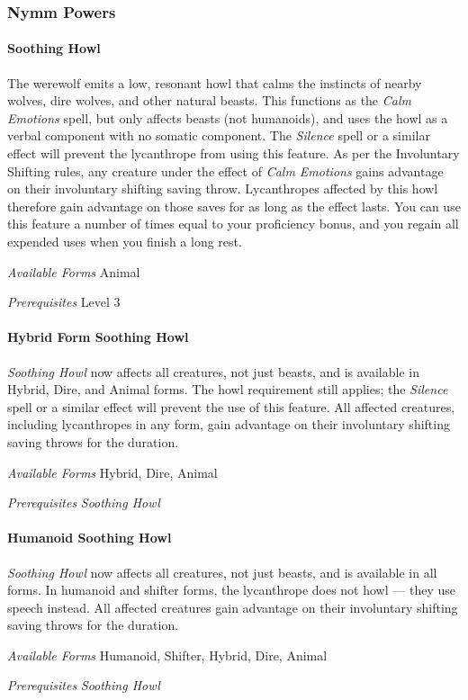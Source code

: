 \documentclass[twocolumn]{dndbook}
\begin{document}
\subsubsection{Nymm Powers}

\paragraph*{Soothing Howl}
The werewolf emits a low, resonant howl that calms the instincts of nearby wolves, dire wolves, and other natural beasts.
This functions as the \emph{Calm Emotions} spell, but only affects beasts (not humanoids), and uses the howl as a verbal component with no somatic component.
The \emph{Silence} spell or a similar effect will prevent the lycanthrope from using this feature.
As per the Involuntary Shifting rules, any creature under the effect of \emph{Calm Emotions} gains advantage on their involuntary shifting saving throw.
Lycanthropes affected by this howl therefore gain advantage on those saves for as long as the effect lasts.
You can use this feature a number of times equal to your proficiency bonus, and you regain all expended uses when you finish a long rest.\par
\emph{Available Forms} Animal\par
\emph{Prerequisites} Level 3\par

\paragraph*{Hybrid Form Soothing Howl}
\emph{Soothing Howl} now affects all creatures, not just beasts, and is available in Hybrid, Dire, and Animal forms.
The howl requirement still applies; the \emph{Silence} spell or a similar effect will prevent the use of this feature.
All affected creatures, including lycanthropes in any form, gain advantage on their involuntary shifting saving throws for the duration.\par
\emph{Available Forms} Hybrid, Dire, Animal\par
\emph{Prerequisites} \emph{Soothing Howl}\par

\paragraph*{Humanoid Soothing Howl}
\emph{Soothing Howl} now affects all creatures, not just beasts, and is available in all forms.
In humanoid and shifter forms, the lycanthrope does not howl --- they use speech instead.
All affected creatures gain advantage on their involuntary shifting saving throws for the duration.\par
\emph{Available Forms} Humanoid, Shifter, Hybrid, Dire, Animal\par
\emph{Prerequisites} \emph{Soothing Howl}\par
\end{document}
